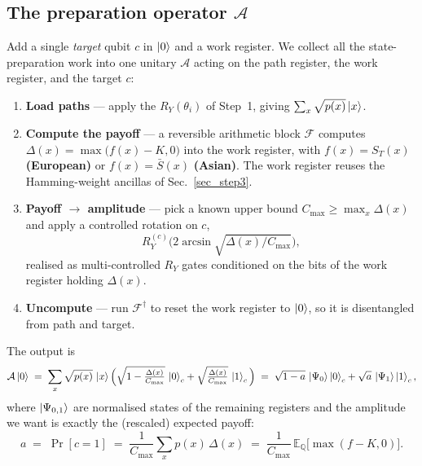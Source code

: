 \documentclass{article}
\begin{document}
\subsection{The preparation operator $\mathcal{A}$}

Add a single \emph{target} qubit $c$ in $\ket{0}$ and a work register. We collect all the state-preparation work into one unitary $\mathcal{A}$ acting on the path register, the work register, and the target $c$:
\begin{enumerate}
    \item \textbf{Load paths} --- apply the $R_Y(\theta_i)$ of Step~1, giving $\sum_x\sqrt{p(x)}\ket{x}$.
    \item \textbf{Compute the payoff} --- a reversible arithmetic block $\mathcal{F}$ computes $\Delta(x)=\max\!\big(f(x)-K,0\big)$ into the work register, with $f(x)=S_T(x)$ \textbf{(European)} or $f(x)=\bar S(x)$ \textbf{(Asian)}. The work register reuses the Hamming-weight ancillas of Sec.~\ref{sec_step3}.
    \item \textbf{Payoff $\to$ amplitude} --- pick a known upper bound $C_{\max}\ge \max_x\Delta(x)$ and apply a controlled rotation on $c$,
    \begin{equation}\label{eq_payoff_rot}
    R_Y^{(c)}\!\Big(2\arcsin\!\sqrt{\Delta(x)/C_{\max}}\Big),
    \end{equation}
    realised as multi-controlled $R_Y$ gates conditioned on the bits of the work register holding $\Delta(x)$.
    \item \textbf{Uncompute} --- run $\mathcal{F}^\dagger$ to reset the work register to $\ket{0}$, so it is disentangled from path and target.
\end{enumerate}
The output is
\begin{equation}\label{eq_A_state}
\mathcal{A}\ket{0} \;=\; \sum_x\sqrt{p(x)}\,\ket{x}\Big(\sqrt{1-\tfrac{\Delta(x)}{C_{\max}}}\,\ket{0}_c + \sqrt{\tfrac{\Delta(x)}{C_{\max}}}\,\ket{1}_c\Big)
\;=\; \sqrt{1-a}\,\ket{\Psi_0}\ket{0}_c + \sqrt{a}\,\ket{\Psi_1}\ket{1}_c ,
\end{equation}
where $\ket{\Psi_{0,1}}$ are normalised states of the remaining registers and the amplitude we want is exactly the (rescaled) expected payoff:
\begin{equation}\label{eq_a_value}
a \;=\; \Pr[c=1] \;=\; \frac{1}{C_{\max}}\sum_x p(x)\,\Delta(x) \;=\; \frac{1}{C_{\max}}\,\mathbb{E}_{\mathbb{Q}}\!\big[\max(f-K,0)\big].
\end{equation}
\end{document}
